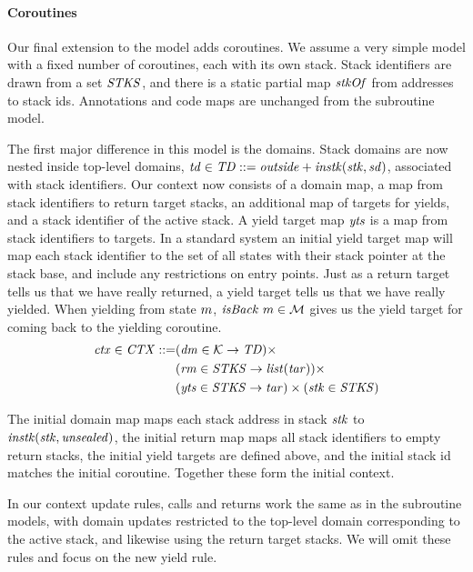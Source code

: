 \documentclass[10pt,conference]{ieeetran}%
\theoremstyle{definition}
\begin{document}
{\medskip

\paragraph*{Coroutines}

Our final extension to the model adds coroutines. We assume a very simple model with
a fixed number of coroutines, each with its own stack.
Stack identifiers are drawn from a set \(\mathit{STKS}\), and there is a static partial map
\(\mathit{stkOf}\) from addresses to stack ids.  Annotations and code maps are unchanged from
the subroutine model.

The first major difference in this model is the domains. Stack domains are now nested inside
top-level domains, \(\mathit{td} \in \mathit{TD} ::= \mathit{outside} + \mathit{instk}(\mathit{stk},\mathit{sd})\),
associated with stack identifiers.
Our context now consists of a domain map, a map from stack identifiers to return target stacks,
an additional map of targets for yields, and a stack identifier of the active stack.
A yield target map \(\mathit{yts}\) is a map from stack identifiers to targets.
In a standard system an initial yield target map will map each stack identifier to the
set of all states with their stack pointer at the stack base, and include any restrictions
on entry points. Just as a return target tells us that we have really returned, a yield
target tells us that we have really yielded. When yielding from state \(m\),
\(\mathit{isBack} ~ m \in {\mathcal M}\) gives us the yield target for coming back to the yielding
coroutine.
%
\[\begin{split}
\mathit{ctx} \in \mathit{CTX} ::= & (\mathit{dm} \in {\mathcal K} \rightarrow \mathit{TD}) \times \\
& (\mathit{rm} \in \mathit{STKS} \rightarrow \mathit{list}(\mathit{tar})) \times \\
& (\mathit{yts} \in \mathit{STKS} \rightarrow \mathit{tar}) \times (\mathit{stk} \in \mathit{STKS})
\end{split}\]

The initial domain map maps each stack address in stack \(\mathit{stk}\) to
\(\mathit{instk}(\mathit{stk},\mathit{unsealed})\), the initial return map maps all stack identifiers to empty
return stacks, the initial yield targets are defined above, and the initial stack id matches the initial
coroutine. Together these form the initial context.

In our context update rules, calls and returns work the same as in the subroutine models,
with domain updates restricted to the top-level domain corresponding to the active stack,
and likewise using the return target stacks. We will omit these rules and focus on the new yield rule.

}
\end{document}
